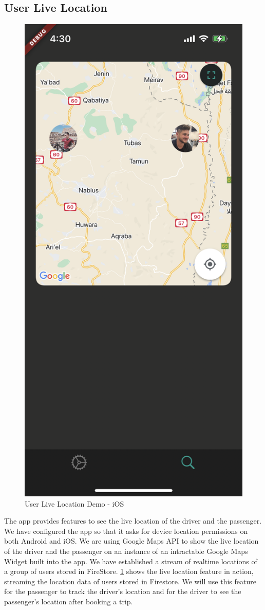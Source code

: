 \documentclass[a4paper, 12pt]{report} %
\begin{document}
            \FloatBarrier

        \subsection{User Live Location}

            \begin{figure}
                \centering
                \includegraphics[width=0.65\linewidth]{Images/live_location.png}
                \caption{User Live Location Demo - iOS}
                \label{fig:live_location_demo}
            \end{figure}
            
            The app provides features to see the live location of the driver and the passenger. We have configured the app so that it asks for device location permissions on both Android and iOS. We are using Google Maps API to show the live location of the driver and the passenger on an instance of an intractable Google Maps Widget built into the app. We have established a stream of realtime locations of a group of users stored in FireStore. \ref{fig:live_location_demo} shows the live location feature in action, streaming the location data of users stored in Firestore. We will use this feature for the passenger to track the driver's location and for the driver to see the passenger's location after booking a trip.
\end{document}
